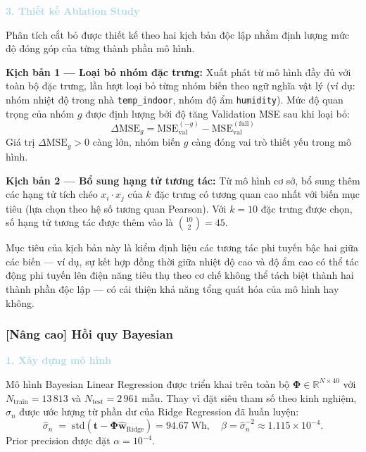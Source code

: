 \noindent\textcolor{lightblue}{\textbf{3. Thiết kế Ablation Study}}

Phân tích cắt bỏ được thiết kế theo hai kịch bản 
độc lập nhằm định lượng mức độ đóng góp của từng thành phần mô hình.

\textbf{Kịch bản 1 --- Loại bỏ nhóm đặc trưng:}
Xuất phát từ mô hình đầy đủ với toàn bộ đặc trưng, lần lượt loại bỏ 
từng nhóm biến theo ngữ nghĩa vật lý (ví dụ: nhóm nhiệt độ trong nhà 
\texttt{temp\_indoor}, nhóm độ ẩm \texttt{humidity}). Mức độ quan trọng 
của nhóm $g$ được định lượng bởi độ tăng Validation MSE sau khi loại bỏ:
$$\Delta\mathrm{MSE}_g 
  = \mathrm{MSE}_{\mathrm{val}}^{(-g)} - \mathrm{MSE}_{\mathrm{val}}^{(\mathrm{full})}$$
Giá trị $\Delta\mathrm{MSE}_g > 0$ càng lớn, nhóm biến $g$ càng đóng 
vai trò thiết yếu trong mô hình.

\textbf{Kịch bản 2 --- Bổ sung hạng tử tương tác:}
Từ mô hình cơ sở, bổ sung thêm các hạng tử tích chéo $x_i \cdot x_j$ 
của $k$ đặc trưng có tương quan cao nhất với biến mục tiêu (lựa chọn 
theo hệ số tương quan Pearson). Với $k = 10$ đặc trưng được chọn, số 
hạng tử tương tác được thêm vào là $\binom{10}{2} = 45$.

Mục tiêu của kịch bản này là kiểm định liệu các tương tác phi tuyến 
bậc hai giữa các biến --- ví dụ, sự kết hợp đồng thời giữa nhiệt độ 
cao và độ ẩm cao có thể tác động phi tuyến lên điện năng tiêu thụ theo 
cơ chế không thể tách biệt thành hai thành phần độc lập --- có cải thiện 
khả năng tổng quát hóa của mô hình hay không.

\subsubsection{[Nâng cao] Hồi quy Bayesian}

\noindent\textcolor{lightblue}{\textbf{1. Xây dựng mô hình}}

Mô hình Bayesian Linear Regression được triển khai trên toàn bộ
$\boldsymbol{\Phi} \in \mathbb{R}^{N \times 40}$ với $N_{\text{train}} = 13\,813$
và $N_{\text{test}} = 2\,961$ mẫu. Thay vì đặt siêu tham số theo kinh nghiệm,
$\sigma_n$ được ước lượng từ phần dư của Ridge Regression đã huấn luyện:
$$
  \hat{\sigma}_n \;=\; \mathrm{std}\!\left(\boldsymbol{t} -
  \boldsymbol{\Phi}\hat{\boldsymbol{w}}_{\mathrm{Ridge}}\right) = 94.67\;\text{Wh},
  \quad \beta = \hat{\sigma}_n^{-2} \approx 1.115 \times 10^{-4}.
$$
Prior precision được đặt $\alpha = 10^{-4}$.

